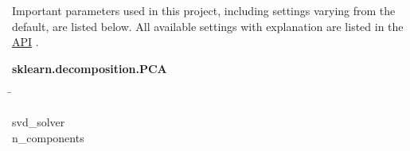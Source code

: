 





Important parameters used in this project, including settings varying from the default, are listed below. All available settings with explanation are listed in the
\href{https://scikit-learn.org/stable/modules/generated/sklearn.decomposition.PCA.html}{API} \autocite{pedregosa_scikit-learn_2011}.


\begin{leftbar}
    \textbf{sklearn.decomposition.PCA}
    \begin{nstabbing}
        \qquad\qquad\qquad\qquad\qquad\quad\=\kill

        svd\_solver \\
        n\_components 
    \end{nstabbing}
\end{leftbar}